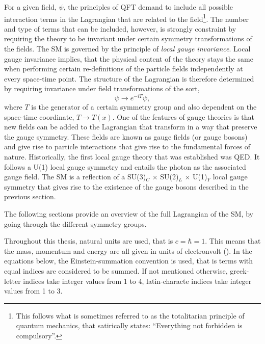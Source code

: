 For a given field, $\psi$, the principles of QFT demand to include all possible interaction terms in the Lagrangian that are related to the field\footnote{This follows what is sometimes referred to as the totalitarian principle of quantum mechanics, that satirically states: ``Everything not forbidden is compulsory''.}.
The number and type of terms that can be included, however, is strongly constraint by requiring the theory to be invariant under certain symmetry transformations of the fields. 
The SM is governed by the principle of \emph{local gauge invariance}. 
Local gauge invariance implies, that the physical content of the theory stays the same when performing certain re-definitions of the particle fields independently at every space-time point.
The structure of the Lagrangian is therefore determined by requiring invariance under field transformations of the sort,
\begin{equation}
  \psi \rightarrow e^{-iT} \psi,
\end{equation}
where $T$ is the generator of a certain symmetry group and also dependent on the space-time coordinate, $T \rightarrow T(x)$. 
One of the features of gauge theories is that new fields can be added to the Lagrangian that transform in a way that preserve the gauge symmetry. 
These fields are known as gauge fields (or gauge bosons) and give rise to particle interactions that give rise to the fundamental forces of nature. 
Historically, the first local gauge theory that was established was QED. It follows a U(1) local gauge symmetry and entails the photon as the associated gauge field. 
The SM is a reflection of a SU(3)$_C$ $\times$ SU(2)$_L$ $\times$ U(1)$_Y$ local gauge symmetry that gives rise to the existence of the gauge bosons described in the previous section.

The following sections provide an overview of the full Lagrangian of the SM, by going through the different symmetry groups. 

Throughout this thesis, natural units are used, that is $c = \hbar = 1$. This means that the mass, momentum and energy are all given in units of electronvolt (\eV).
In the equations below, the Einstein-summation convention is used, that is terms with equal indices are considered to be summed. If not mentioned otherwise, greek-letter indices take integer values from 1 to 4, latin-characte indices take integer values from 1 to 3.


